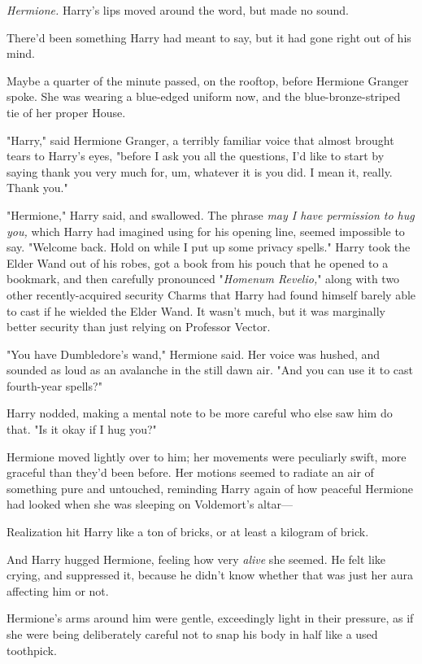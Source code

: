 \emph{Hermione.} Harry's lips moved around the word, but made no sound.

There'd been something Harry had meant to say, but it had gone right out of his
mind.

Maybe a quarter of the minute passed, on the rooftop, before Hermione Granger
spoke. She was wearing a blue-edged uniform now, and the blue-bronze-striped
tie of her proper House.

"Harry," said Hermione Granger, a terribly familiar voice that almost brought
tears to Harry's eyes, "before I ask you all the questions, I'd like to start
by saying thank you very much for, um, whatever it is you did. I mean it,
really. Thank you."

"Hermione," Harry said, and swallowed. The phrase \emph{may I have permission
to hug you,} which Harry had imagined using for his opening line, seemed
impossible to say. "Welcome back. Hold on while I put up some privacy spells."
Harry took the Elder Wand out of his robes, got a book from his pouch that he
opened to a bookmark, and then carefully pronounced "\emph{Homenum Revelio,}"
along with two other recently-acquired security Charms that Harry had found
himself barely able to cast if he wielded the Elder Wand. It wasn't much, but
it was marginally better security than just relying on Professor Vector.

"You have Dumbledore's wand," Hermione said. Her voice was hushed, and sounded
as loud as an avalanche in the still dawn air. "And you can use it to cast
fourth-year spells?"

Harry nodded, making a mental note to be more careful who else saw him do that.
"Is it okay if I hug you?"

Hermione moved lightly over to him; her movements were peculiarly swift, more
graceful than they'd been before. Her motions seemed to radiate an air of
something pure and untouched, reminding Harry again of how peaceful Hermione
had looked when she was sleeping on Voldemort's altar---

Realization hit Harry like a ton of bricks, or at least a kilogram of brick.

And Harry hugged Hermione, feeling how very \emph{alive} she seemed. He felt
like crying, and suppressed it, because he didn't know whether that was just
her aura affecting him or not.

Hermione's arms around him were gentle, exceedingly light in their pressure, as
if she were being deliberately careful not to snap his body in half like a used
toothpick.

